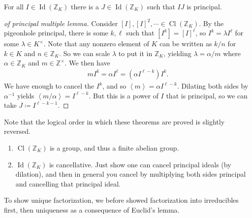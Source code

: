 \begin{lemma}

For all \(I\in \operatorname{Id}({\mathbb{Z}}_K)\) there is a
\(J \in \operatorname{Id}({\mathbb{Z}}_K)\) such that \(IJ\) is
principal.

\end{lemma}

\begin{proof}[of principal multiple lemma]

Consider \([I], [I]^2, \cdots \in \operatorname{Cl}({\mathbb{Z}}_K)\).
By the pigeonhole principal, there is some \(k, \ell\) such that
\([I^k] = [I]^\ell\), so \(I^k = \lambda I^\ell\) for some
\(\lambda \in K^{\times}\). Note that any nonzero element of \(K\) can
be written as \(k/n\) for \(k\in K\) and \(n\in {\mathbb{Z}}_K\). So we
can scale \(\lambda\) to put it in \({\mathbb{Z}}_K\), yielding
\(\lambda = \alpha/m\) where \(\alpha\in {\mathbb{Z}}_K\) and
\(m\in {\mathbb{Z}}^{\times}\). We then have
\begin{align*}
mI^k = \alpha I^\ell = (\alpha I^{\ell-k})I^k
.\end{align*}
We have enough to cancel the \(I^k\), and so
\(\left\langle{ m }\right\rangle= \alpha I^{\ell - k}\). Dilating both
sides by \(\alpha^{-1}\) yields
\(\left\langle{ m/\alpha }\right\rangle = I^{\ell-k}\). But this is a
power of \(I\) that is principal, so we can take
\(J \coloneqq I^{\ell-k-1}\).

\end{proof}

\begin{remark}

Note that the logical order in which these theorems are proved is
slightly reversed.

\end{remark}

\begin{corollary}

\envlist

\begin{enumerate}
\def\labelenumi{\alph{enumi}.}
\item
  \(\operatorname{Cl}({\mathbb{Z}}_K)\) is a group, and thus a finite
  abelian group.
\item
  \(\operatorname{Id}({\mathbb{Z}}_K)\) is cancellative. Just show one
  can cancel principal ideals (by dilation), and then in general you
  cancel by multiplying both sides principal and cancelling that
  principal ideal.
\end{enumerate}

To show unique factorization, we before showed factorization into
irreducibles first, then uniqueness as a consequence of Euclid's lemma.

\end{corollary}

